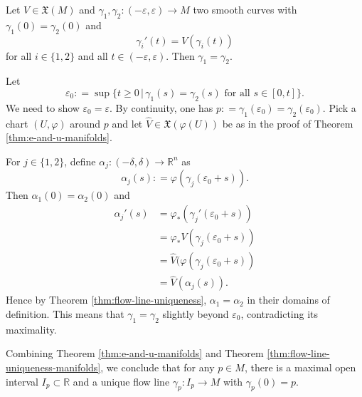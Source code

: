 \documentclass{ximera}
\begin{document}
    \begin{theorem}\label{thm:flow-line-uniqueness-manifolds}
        Let $V  \in \mathfrak{X} (M) $ and $\gamma _1 , \gamma _2  : (- \varepsilon , \varepsilon ) \to M$ two smooth curves with $\gamma _1 (0) = \gamma _2 (0) $  and 
        \[        \gamma _i ' (t) = V (\gamma _i (t) )  \]
        for all $i \in \{ 1, 2 \}$ and all $t \in (- \varepsilon  , \varepsilon )$. Then $\gamma _1 = \gamma_2$. 
    
    \begin{solution}
        Let 
        \[ \varepsilon_0 : = \sup  \{ t \geq 0 \,\vert \,  \gamma_1 (s) = \gamma _2 (s) \text{ for all } s \in [0,t] \} .  \]
        We need to show $\varepsilon _ 0 = \varepsilon$. By continuity, one has $p : = \gamma _1 (\varepsilon _0 ) = \gamma_2 (\varepsilon _0)$. Pick a chart $(U, \varphi)$ around $p$ and let $\hat{V} \in \mathfrak{X}(\varphi (U))$ be as in the proof of Theorem \ref{thm:e-and-u-manifolds}. 

        For $j \in \{ 1, 2 \} $, define $\alpha _j : (- \delta , \delta ) \to \mathbb{R}^n $ as
        \[       \alpha _j (s) : = \varphi ( \gamma _j (\varepsilon_0 + s) ).     \]
        Then $\alpha_1 (0) = \alpha _2 (0)$ and
        \begin{align*}
            \alpha_j ' (s) & = \varphi _{\ast} (  \gamma_j ' (\varepsilon_0 + s)   ) \\
            & = \varphi _{\ast} V (  \gamma _j ( \varepsilon_0 + s ) ) \\
            & = \hat{V} ( \varphi ( \gamma _j (\varepsilon_0 + s) ) \\
            & = \hat{V} ( \alpha_j (s) ).
        \end{align*}
        Hence by Theorem \ref{thm:flow-line-uniqueness}, $\alpha_1 = \alpha _2 $ in their domains of definition. This means that $\gamma _1 = \gamma _2$ slightly beyond $\varepsilon_0$, contradicting its maximality. 
    \end{solution}
\end{theorem}


    \begin{remark}
        Combining Theorem \ref{thm:e-and-u-manifolds} and Theorem \ref{thm:flow-line-uniqueness-manifolds}, we conclude that for any $p \in M$, there is a maximal open interval $I_p \subset \mathbb{R}$ and a unique flow line $\gamma_p : I_p \to M$ with $\gamma_p (0) = p$. 
    \end{remark}
\end{document}
